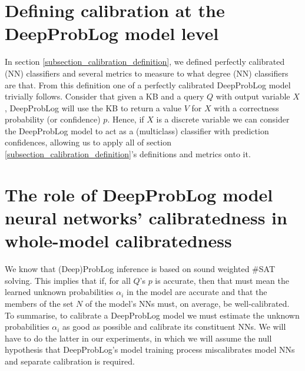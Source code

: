 \section{Defining calibration at the DeepProbLog model level}
In section \ref{subsection_calibration_definition}, we defined perfectly calibrated (NN) classifiers and several metrics to measure to what degree (NN) classifiers are that. From this definition one of a perfectly calibrated DeepProbLog model trivially follows. Consider that given a KB and a query $Q$ with output variable $X$, DeepProbLog will use the KB to return a value $V$ for $X$ with a correctness probability (or confidence) $p$. Hence, if $X$ is a discrete variable we can consider the DeepProbLog model to act as a (multiclass) classifier with prediction confidences, allowing us to apply all of section \ref{subsection_calibration_definition}'s definitions and metrics onto it.

\section{The role of DeepProbLog model neural networks' calibratedness in whole-model calibratedness}
We know that (Deep)ProbLog inference is based on sound weighted \#SAT solving. This implies that if, for all $Q$'s $p$ is accurate, then that must mean the learned unknown probabilities $\alpha_{i}$ in the model are accurate and that the members of the set $N$ of the model's NNs must, on average, be well-calibrated. To summarise, to calibrate a DeepProbLog model we must estimate the unknown probabilities $\alpha_{i}$ as good as possible and calibrate its constituent NNs. We will have to do the latter in our experiments, in which we will assume the null hypothesis that DeepProbLog's model training process miscalibrates model NNs and separate calibration is required.

